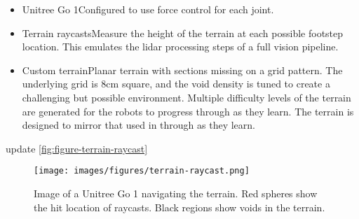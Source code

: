 \begin{itemize}
  \item Unitree Go 1\textemdash Configured to use force control for each joint.
  \item Terrain raycasts\textemdash Measure the height of the terrain
    at each possible footstep location. This emulates the lidar
    processing steps of a full vision pipeline.
  \item Custom terrain\textemdash Planar terrain with sections
    missing on a grid pattern. The underlying grid is 8cm square, and
    the void density is tuned to create a challenging but possible
    environment. Multiple difficulty levels of the terrain are generated
    for the robots to progress through as they learn.
    The terrain is designed to mirror that used in
    \cite{bratta_contactnet_2024}
    through as they learn.
\end{itemize}

\begin{todo}
  update \autoref{fig:figure-terrain-raycast}
\end{todo}

\begin{figure}[H]
  \centering
  \texttt{[image: images/figures/terrain-raycast.png]}
  \caption{Image of a Unitree Go 1 navigating the terrain. Red
    spheres show the hit location of raycasts. Black regions show voids
  in the terrain.}
  \label{fig:figure-terrain-raycast}
\end{figure}
